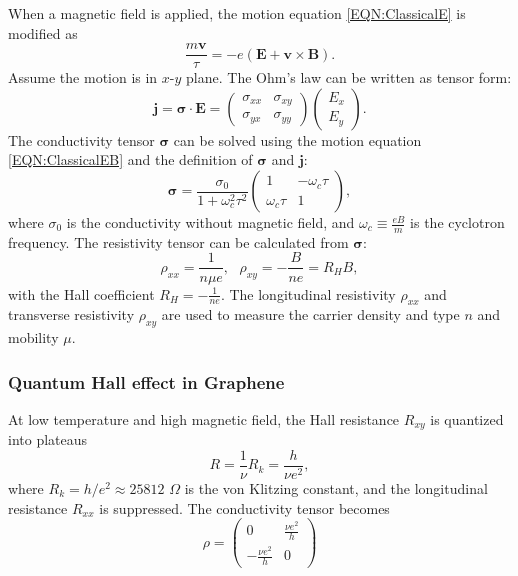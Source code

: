 \documentclass[pdflatex, sectionletters, 12pt]{pittetd}    %
\begin{document}
When a magnetic field is applied, the motion equation \ref{EQN:ClassicalE} is modified as 
\begin{equation}
\frac{m\mathbf{v}}{\tau} = -e(\mathbf{E} + \mathbf{v} \times \mathbf{B}).
\label{EQN:ClassicalEB}
\end{equation}
Assume the motion is in $x$-$y$ plane. The Ohm's law can be written as tensor form:
$$
\mathbf{j} = 
\mathbf{\sigma} \cdot \mathbf{E} =
\begin{pmatrix}
\sigma_{xx} & \sigma_{xy} \\
\sigma_{yx} & \sigma_{yy}
\end{pmatrix}
\begin{pmatrix}
E_{x} \\
E_{y}
\end{pmatrix}.
$$
The conductivity tensor $\mathbf{\sigma}$ can be solved using the motion equation \ref{EQN:ClassicalEB} and the definition of $\mathbf{\sigma}$ and $\mathbf{j}$:
$$
\mathbf{\sigma} = \frac{\sigma_0}{1 + \omega_c^2\tau^2}
\begin{pmatrix}
1 & -\omega_c\tau \\
\omega_c\tau & 1
\end{pmatrix},
$$
where $\sigma_0$ is the conductivity without magnetic field, and $\displaystyle \omega_c \equiv \frac{eB}{m}$ is the cyclotron frequency. The resistivity tensor can be calculated from $\mathbf{\sigma}$:
\begin{equation}
\rho_{xx} = \frac{1}{n\mu e}, \ \ \ \rho_{xy} = -\frac{B}{n e} = R_H B,
\label{EQN:Hall}
\end{equation}
with the Hall coefficient $\displaystyle R_H = -\frac{1}{ne}.$
The longitudinal resistivity $\rho_{xx}$ and transverse resistivity $\rho_{xy}$ are used to measure the carrier density and type $n$ and mobility $\mu$.

\subsubsection{Quantum Hall effect in Graphene}
\label{SEC:QuantumHall}

At low temperature and high magnetic field, the Hall resistance $R_{xy}$ is quantized into plateaus 
$$
R = \frac{1}{\nu}R_k = \frac{h}{\nu e^2},
$$
where $R_k = h/e^2 \approx 25812$ $\Omega$ is the von Klitzing constant, and the longitudinal resistance $R_{xx}$ is suppressed. The conductivity tensor becomes
$$ \displaystyle
\rho = 
\begin{pmatrix}
0 & \frac{\nu e^2}{h} \\ 
-\frac{\nu e^2}{h} & 0
\end{pmatrix}
$$
\end{document}
